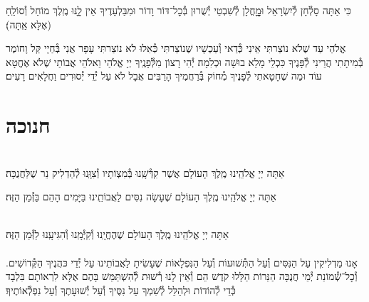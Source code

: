 \documentclass[twoside, openany, parskip=half, 11pt]{book}
\begin{document}
כִּי אַתָּה סָלְ֯חָן לְ֯יִשְׂרָאֵל וּמׇׇׇׇחֳלָן לְ֯שִׁבְטֵי יְ֯שֻׁרוּן בְּ֯כׇל־דּוֹר וָדוֹר
וּמִבַּלְעָדֶיךָ אֵין לׇׇֽנּוּ מֶֽלֶךְ מוֹחֵל וְ֯סוֹלֵֽחַ (אֶלָּא אַֽתָּה)׃

אֱלֹהַי עַד שֶׁלֹא נוֹצַרתִּי אֵינִי כְּ֯דַאי וְ֯עַכְשָׁיו שֶׁנוֹצַרתִּי כְּ֯אִלוּ לֹא נוֹצַרתִּי עָפָר אֲנִי בְּ֯חַיָי קַּל וָחוֹמֶר בְּ֯מִיתָתִי הֲרֵינִי לְ֯פָּנֶיךָ כִּכְלֵי מָלֵא בוּשָׁה וּכְלִמָה׃ יְ֯הִי רָצוֹן מִלְּ֯פָנֶֽיךָ יְיָ אֱלֹהַי וֵאלֹהֵי אֲבוֹתַי שֶׁלֹא אֶחֱטָא עוֹד וּמַה שֶׁחָטָאתִי לְ֯פָנֶיךָ מְ֯חוֹק בְּ֯רַחֲמֶיךָ הָרַבִּים אֲבָל לֹא עַל יְ֯דֵי יְ֯סוּרִים וַחֲלָאִים רָעִים׃

\vfill
\sepline

\chapter[חנוכה]{ חנוכה }
\label{chanukah}

\\
אַתָּה יְיָ אֱלֹהֵֽינוּ מֶֽלֶךְ הָעוֹלָם
אֲשֶׁר קִדְּ֯שָֽׁנוּ בְּ֯מִצְוֹתָיו וְ֯צִוָּֽנוּ לְ֯הַדְלִיק נֵר שֶׁלַּחֲנֻכָּה׃

אַתָּה יְיָ אֱלֹהֵֽינוּ מֶֽלֶךְ הָעוֹלָם שֶׁעָשָׂה נִסִּים לַאֲבוֹתֵֽינוּ בַּיָּמִים הָהֵם בַּזְּ֯מַן הַזֶּה׃

\\
אַתָּה יְיָ אֱלֹהֵֽינוּ מֶֽלֶךְ הָעוֹלָם שֶׁהֶחֱיָֽנוּ וְ֯קִיְּ֯מָֽנוּ וְ֯הִגִּיעָֽנוּ לַזְּ֯מַן הַזֶּה׃\\

\\
אָנוּ מַדְלִיקִין
עַל הַנִּסִּים וְ֯עַל הַתְּ֯שׁוּעוֹת
וְ֯עַל הַנִּפְלָאוֹת
שֶׁעָשִׂיתָ לַאֲבוֹתֵינוּ
עַל יְ֯דֵי כּהֲנֶיךָ הַקְּ֯דוֹשִׁים.
וְ֯כׇל־שְׁ֯מוֹנַת יְ֯מֵי חֲנֻכָּה
הַנֵּרוֹת הַלָּלוּ קֹדֶשׁ הֵם
וְ֯אֵין לָנוּ רְ֯שׁוּת לְ֯הִשְׁתַּמֵּשׁ בָּהֶם
אֶלָּא לִרְאוֹתָם בִּלְבָד
כְּ֯דֵי לְ֯הוֹדוֹת וּלְהַלֵּל לְ֯שִׁמְךָ
עַל נִסֶּיךָ וְ֯עַל יְ֯שׁוּעָתֶךָ
וְ֯עַל נִפְלְ֯אוֹתֶיךָ׃
\end{document}
